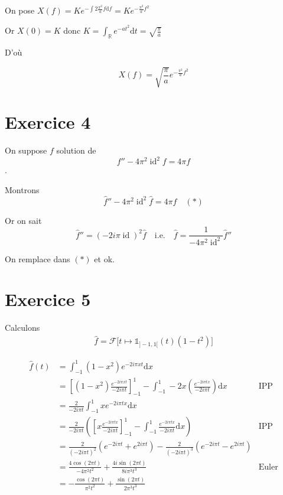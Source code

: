 \documentclass{article}
\renewcommand{\d}{\mathrm{d}}
\newcommand{\cF}{\mathcal{F}}
\newcommand{\R}{\mathbb{R}}
\newcommand{\id}{\operatorname{id}}
\begin{document}
On pose $X(f) = K e^{-\int 2 \frac{\pi^2}{a} f \d f} = Ke^{-\frac{\pi^2}{a} f^2}$

Or $X(0) = K$ donc $K = \int_\R e^{-at^2} \d t = \sqrt{\frac{\pi}{a}} $

D'où

\[
	X(f) = \sqrt{\frac{\pi}{a}}  e^{-\frac{\pi^2}{a} f^2}
\] 

\section{Exercice 4}

On suppose $f$ solution de 
\[
	f'' - 4\pi^2 \id^2 f = 4 \pi f
\] .

Montrons 
\[
	\widehat{f}'' - 4 \pi^2 \id^2 \widehat{f} = 4 \pi \widehat{f}\quad(\ast)
\] 

Or on sait \[
	\widehat{f}'' = (-2i \pi \id)^2 \widehat{f} \quad \text{i.e.} \quad \widehat{f} = \frac{1}{-4 \pi^2 \id^2} \widehat{f}''
\] 

On remplace dans $(\ast)$ et ok.

 \section{Exercice 5}


Calculons 
 \begin{align*}
	 \widehat{f} = \cF\big[t \mapsto \mathbb{1}_{]-1, 1[}(t) (1 - t^2)\big]
 \end{align*}

 \begin{align*}
 	\widehat{f}(t) &= \int_{-1}^{1} (1-x^2) e^{-2i\pi x t} \d x \\
		   &= \left[ (1-x^2) \frac{e^{-2i \pi xt}}{-2i \pi t} \right]_{-1}^{1} - \int_{-1}^{1} -2x \left( \frac{e^{-2i \pi t x}}{-2i \pi t}  \right) \d x \quad&\text{IPP} \\
		   &= \frac{2}{-2i \pi t} \int_{-1}^1 x e^{-2i \pi t x} \d x \\
		   &= \frac{2}{-2i \pi t} \left( \left[ x \frac{e^{-2i\pi tx}}{-2i \pi t} \right]_{-1}^1 - \int_{-1}^1 \frac{e^{-2i\pi tx}}{-2i\pi t} \d x \right) \quad&\text{IPP} \\
		   &= \frac{2}{(-2i \pi t)^2} (e^{-2i\pi t} + e^{2i\pi t}) - \frac{2}{(-2i \pi t)^3} (e^{-2i \pi t} - e^{2 i \pi t}) \\
		   &= \frac{4 \cos(2 \pi t)}{-4 \pi ^2 t^2} + \frac{4i \sin(2 \pi t)}{8i \pi^3 t^3} \quad&\text{Euler} \\
		   &= - \frac{\cos(2 \pi t)}{\pi^2 t^2} + \frac{\sin(2 \pi t)}{2 \pi^3 t^3} \\
 \end{align*}
\end{document}

